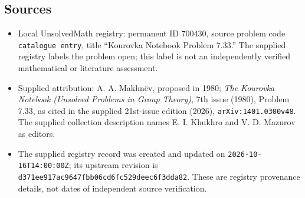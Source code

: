 \documentclass[11pt]{article}
\begin{document}
\subsection{Sources}
\begin{itemize}
\item Local UnsolvedMath registry: permanent ID \(700430\), source problem code \texttt{catalogue entry}, title ``Kourovka Notebook Problem 7.33.'' The supplied registry labels the problem open; this label is not an independently verified mathematical or literature assessment.
\item Supplied attribution: A. A. Makhn\"ev, proposed in 1980; \emph{The Kourovka Notebook (Unsolved Problems in Group Theory)}, 7th issue (1980), Problem 7.33, as cited in the supplied 21st-issue edition (2026), \texttt{arXiv:1401.0300v48}. The supplied collection description names E. I. Khukhro and V. D. Mazurov as editors.
\item The supplied registry record was created and updated on \texttt{2026-10-16T14:00:00Z}; its upstream revision is \texttt{d371ee917ac9647fbb06cd6fc529deec6f3dda82}. These are registry provenance details, not dates of independent source verification.
\end{itemize}
\end{document}
